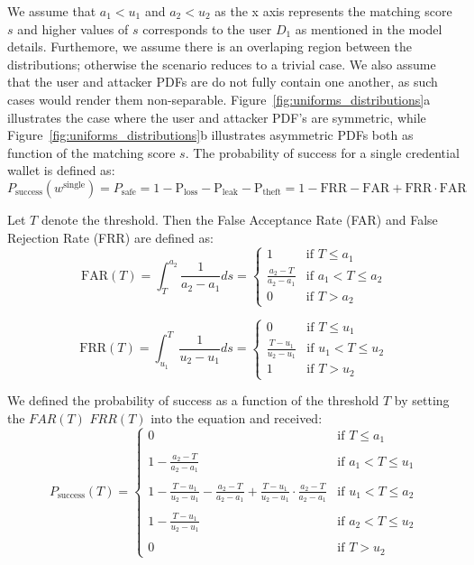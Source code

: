 \documentclass[sigconf]{acmart}
\theoremstyle{definition}
\begin{document}
We assume that $a_1 < u_1$ and $a_2 < u_2$ as the x axis represents the matching score $s$ and higher values of $s$ corresponds to the user $D_1$ as mentioned in the model details. Furthemore, we assume there is an overlaping region between the distributions; otherwise the scenario reduces to a trivial case. We also assume that the user and attacker PDFs are do not fully contain one another, as such cases would render them non-separable. Figure~\ref{fig:uniforms_distributions}a illustrates the case where the user and attacker PDF's are symmetric, while Figure~\ref{fig:uniforms_distributions}b illustrates asymmetric PDFs both as function of the matching score $s$.
The probability of success for a single credential wallet is defined as: 
\[ 
P_{\text{success}}(w^{\text{single}}) = P_{{\text{safe}}} = 1-\mathrm{P_{\text{loss}}}-\mathrm{P_{\text{leak}}}-\mathrm{P_{\text{theft}}}=1-\mathrm{FRR} - \mathrm{FAR} + \mathrm{FRR} \cdot \mathrm{FAR}
\]

Let $T$ denote the threshold. Then the False Acceptance Rate (FAR) and False Rejection Rate (FRR) are defined as:
\[
\text{FAR}(T) = \int_{T}^{a_2} \frac{1}{a_2-a_1} ds =
\left\{
\begin{array}{ll}
1 & \text{if } T \le a_1 \\
\frac{a_2 - T}{a_2 - a_1} & \text{if } a_1 < T \le a_2 \\
0 & \text{if } T > a_2
\end{array}
\right.
\]

\[
\text{FRR}(T) = \int_{u_1}^{T} \frac{1}{u_2-u_1} ds =
\left\{
\begin{array}{ll}
0 & \text{if } T \le u_1 \\
\frac{T - u_1}{u_2 - u_1} & \text{if } u_1 < T \le u_2 \\
1 & \text{if } T > u_2
\end{array}
\right.
\]

We defined the probability of success as a function of the threshold $T$ by setting the $FAR(T)$ $FRR(T)$ into the equation and received:
\[
P_{\text{success}}(T) = 
\left\{
\begin{array}{ll}
    0 & \text{if } T \le a_1 \\
    \\
    1 - \frac{a_2-T}{a_2 - a_1} & \text{if } a_1 < T \le u_1 \\
    \\
    1 - \frac{T - u_1}{u_2 - u_1} - \frac{a_2 - T}{a_2 - a_1} + \frac{T-u_1}{u_2 - u_1}\cdot\frac{a_2 - T}{a_2 - a_1} & \text{if } u_1 < T \le a_2 \\
    \\
    1 - \frac{T - u_1}{u_2 - u_1} & \text{if } a_2 < T \le u_2 \\
    \\
    0 & \text{if } T > u_2
    \end{array}
\right.
\]
\end{document}
